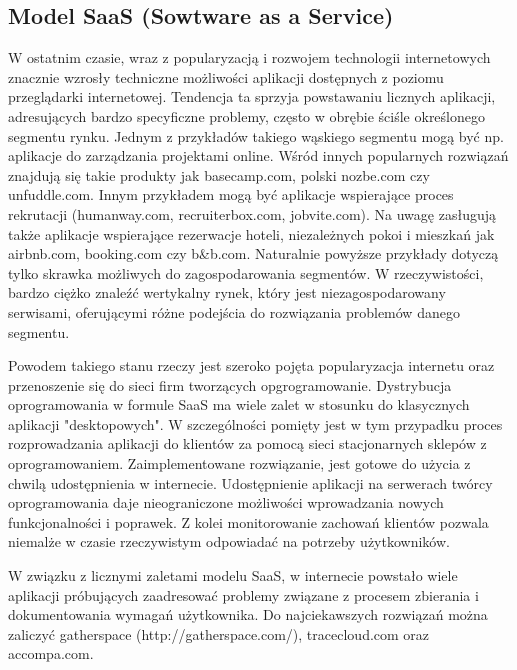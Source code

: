     \subsection{Model SaaS (Sowtware as a Service)}


      W ostatnim czasie, wraz z popularyzacją i rozwojem technologii internetowych znacznie wzrosły techniczne możliwości aplikacji dostępnych z poziomu przeglądarki internetowej. Tendencja ta sprzyja powstawaniu licznych aplikacji, adresujących bardzo specyficzne problemy, często w obrębie ściśle określonego segmentu rynku. Jednym z przykładów takiego wąskiego segmentu mogą być np. aplikacje do zarządzania projektami online. Wśród innych popularnych rozwiązań znajdują się takie produkty jak basecamp.com, polski nozbe.com czy unfuddle.com. Innym przykładem mogą być aplikacje wspierające proces rekrutacji (humanway.com, recruiterbox.com, jobvite.com). Na uwagę zasługują także aplikacje wspierające rezerwacje hoteli, niezależnych pokoi i mieszkań jak airbnb.com, booking.com czy b\&b.com. Naturalnie powyższe przykłady dotyczą tylko skrawka możliwych do zagospodarowania segmentów. W rzeczywistości, bardzo ciężko znaleźć wertykalny rynek, który jest niezagospodarowany serwisami, oferującymi różne podejścia do rozwiązania problemów danego segmentu. 

      Powodem takiego stanu rzeczy jest szeroko pojęta popularyzacja internetu oraz przenoszenie się do sieci firm tworzących opgrogramowanie. Dystrybucja oprogramowania w formule SaaS ma wiele zalet w stosunku do klasycznych aplikacji "desktopowych". W szczególności pomięty jest w tym przypadku proces rozprowadzania aplikacji do klientów za pomocą sieci stacjonarnych sklepów z oprogramowaniem. Zaimplementowane rozwiązanie, jest gotowe do użycia z chwilą udostępnienia w internecie. Udostępnienie aplikacji na serwerach twórcy oprogramowania daje nieograniczone możliwości wprowadzania nowych funkcjonalności i poprawek. Z kolei monitorowanie zachowań klientów pozwala niemalże w czasie rzeczywistym odpowiadać na potrzeby użytkowników. 

      W związku z licznymi zaletami modelu SaaS, w internecie powstało wiele aplikacji próbujących zaadresować problemy związane z procesem zbierania i dokumentowania wymagań użytkownika. Do najciekawszych rozwiązań można zaliczyć gatherspace (http://gatherspace.com/), tracecloud.com oraz accompa.com.


